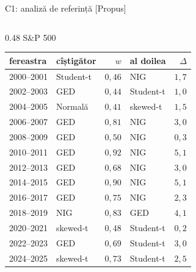 \ifsolutions
\begin{frame}{C1: analiză de referință [Propus]}
\itemsize{\scriptsize}
\begin{columns}[T]
\begin{column}{0.48\textwidth}
\centering S\&P 500\begin{center}
\tiny
\begin{tabular}{llrlr}
\toprule
fereastra & cîștigător & $w$ & al doilea & $\Delta$ \\
\midrule
2000--2001 & Student-t & $0{,}46$ & NIG & $1{,}7$ \\
2002--2003 & GED & $0{,}44$ & Student-t & $1{,}0$ \\
2004--2005 & Normală & $0{,}41$ & skewed-t & $1{,}5$ \\
2006--2007 & GED & $0{,}81$ & NIG & $3{,}0$ \\
2008--2009 & GED & $0{,}50$ & NIG & $0{,}3$ \\
2010--2011 & GED & $0{,}92$ & NIG & $5{,}1$ \\
2012--2013 & GED & $0{,}68$ & NIG & $3{,}0$ \\
2014--2015 & GED & $0{,}90$ & NIG & $5{,}1$ \\
2016--2017 & GED & $0{,}75$ & NIG & $2{,}3$ \\
2018--2019 & NIG & $0{,}83$ & GED & $4{,}1$ \\
2020--2021 & skewed-t & $0{,}48$ & Student-t & $0{,}2$ \\
2022--2023 & GED & $0{,}69$ & Student-t & $3{,}0$ \\
2024--2025 & skewed-t & $0{,}73$ & Student-t & $2{,}5$ \\
\bottomrule
\end{tabular}
\end{center}


\end{column}
\end{columns}
\end{frame}
